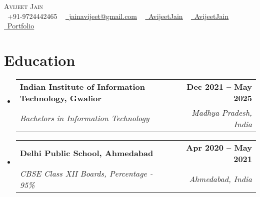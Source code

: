 \documentclass[letterpaper,11pt]{article}
\makeatletter
\newcommand{\resumeSubheading}[4]{
  \vspace{-2pt}\item
    \begin{tabular*}{1.0\textwidth}[t]{l@{\extracolsep{\fill}}r}
      \textbf{#1} & \textbf{\small #2} \\
      \textit{\small#3} & \textit{\small #4} \\
    \end{tabular*}\vspace{-7pt}
}
\newcommand{\resumeSubHeadingListStart}{\begin{itemize}[leftmargin=0.0in, label={}]}
\newcommand{\resumeSubHeadingListEnd}{\end{itemize}}
\makeatother
\begin{document}


\begin{center}
    {\Huge \scshape Avijeet Jain} \\ \vspace{1pt}
    \small \raisebox{-0.1\height}\faPhone\ +91-9724442465 ~ 
    \textcolor{OliveGreen}{\href{mailto:jainavijeet@gmail.com}{\raisebox{-0.2\height}\faEnvelope\  \underline{jainavijeet@gmail.com}}} ~ 
    \textcolor{OliveGreen}{\href{https://www.linkedin.com/in/avijeetjain/}{\raisebox{-0.2\height}\faLinkedin\ \underline{AvijeetJain}}}  ~
    \textcolor{OliveGreen}{\href{https://github.com/AvijeetJain}{\raisebox{-0.2\height}\faGithub\ \underline{AvijeetJain}}}  ~
    \textcolor{OliveGreen}{\href{https://portfolio-website-isgr.vercel.app/}{\raisebox{-0.2\height}\faGlobe\ \underline{Portfolio}}}
    \vspace{-8pt}
\end{center}


\section{Education}
  \resumeSubHeadingListStart
    \resumeSubheading
      {Indian Institute of Information Technology, Gwalior}{Dec 2021 -- May 2025}
      {Bachelors in Information Technology}{Madhya Pradesh, India}

    \resumeSubheading
      {Delhi Public School, Ahmedabad}{Apr 2020 -- May 2021}
      {CBSE Class XII Boards, Percentage - 95\%}{Ahmedabad, India}
  \resumeSubHeadingListEnd
\end{document}
